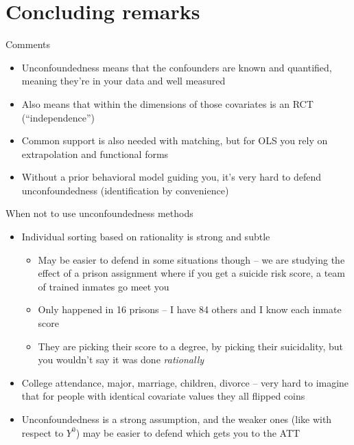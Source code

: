 \documentclass{beamer}
\begin{document}
\section{Concluding remarks}



\begin{frame}{Comments}


\begin{itemize}

\item Unconfoundedness means that the confounders are known and quantified, meaning they're in your data and well measured
\item Also means that within the dimensions of those covariates is an RCT (``independence'')
\item Common support is also needed with matching, but for OLS you rely on extrapolation and functional forms
\item Without a prior behavioral model guiding you, it's very hard to defend unconfoundedness (identification by convenience) 

\end{itemize}

\end{frame}

\begin{frame}{When not to use unconfoundedness methods}

\begin{itemize}
\item Individual sorting based on rationality is strong and subtle
	\begin{itemize}
	\item May be easier to defend in some situations though -- we are studying the effect of a prison assignment where if you get a suicide risk score, a team of trained inmates go meet you
	\item Only happened in 16 prisons -- I have 84 others and I know each inmate score
	\item They are picking their score to a degree, by picking their suicidality, but you wouldn't say it was done \emph{rationally}
	\end{itemize}
\item College attendance, major, marriage, children, divorce -- very hard to imagine that for people with identical covariate values they all flipped coins
\item Unconfoundedness is a strong assumption, and the weaker ones (like with respect to $Y^0$) may be easier to defend which gets you to the ATT

\end{itemize}

\end{frame}  
\end{document}
